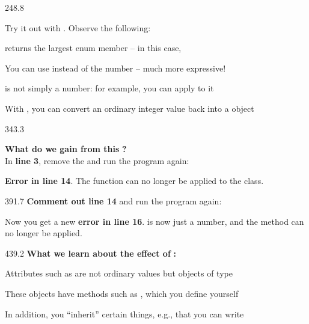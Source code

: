\documentclass{aslab}
\begin{document}
\begin{region}[pitch=13.5]{248.8}
\begin{tasks}
\item Try it out with . Observe the following:
  \begin{bullets}
  \item {} returns the largest enum member -- in this
    case, 
  \item You can use  instead of the number  --
    much more expressive!
  \item {} is not simply a number: for example, you can
    apply  to it
  \item With , you can convert an ordinary integer value
    back into a  object
  \end{bullets}
\end{tasks}
\end{region}

\begin{region}[pitch=14.3]{343.3}
\begin{tasks}[start=2]
\item \textbf{What do we gain from this} \textbf{?}\\
  In \textbf{line 3}, remove the  and run the program again:
  \begin{bullets}
  \item \textbf{Error in line 14}. The function  can no longer be
    applied to the class.
  \end{bullets}
\end{tasks}
\end{region}

\begin{region}[x=74.7,right=0,pitch=13.6]{391.7}
\textbf{Comment out line 14} and run the program again:
\begin{bullets}
\item Now you get a new \textbf{error in line 16}.  is
  now just a number, and the method  can no longer be applied.
\end{bullets}
\end{region}

\begin{region}[x=74.7,right=0,pitch=13.5]{439.2}
\textbf{What we learn about the effect of} \textbf{:}
\begin{bullets}
\item Attributes such as  are not ordinary 
  values but objects of type 
\item These objects have methods such as , which you define
  yourself
\item In addition, you ``inherit'' certain things, e.g., that you can write
\end{bullets}
\end{region}
\end{document}
